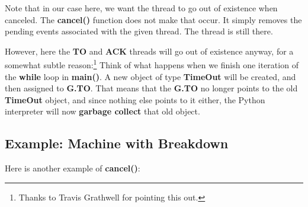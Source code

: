 \documentclass[11pt]{article}
\begin{document}
Note that in our case here, we want the thread to go out of existence
when canceled. The {\bf cancel()} function does not make that occur. It
simply removes the pending events associated with the given thread. The
thread is still there. 

However, here the {\bf TO} and {\bf ACK} threads will go out of
existence anyway, for a somewhat subtle reason:\footnote{Thanks to
Travis Grathwell for pointing this out.}  Think of what happens when we
finish one iteration of the {\bf while} loop in {\bf main()}.  A new
object of type {\bf TimeOut} will be created, and then assigned to {\bf
G.TO}.  That means that the {\bf G.TO} no longer points to the old {\bf
TimeOut} object, and since nothing else points to it either, the Python
interpreter will now {\bf garbage collect} that old object.

\subsection{Example:  Machine with Breakdown}
\label{break}

Here is another example of {\bf cancel()}:
\end{document}
